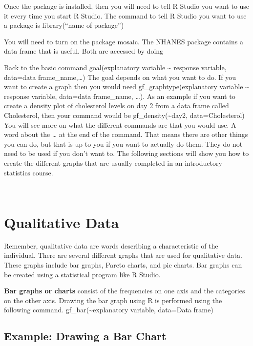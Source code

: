 \documentclass[]{book}
\begin{document}
Once the package is installed, then you will need to tell R Studio you want to use it every time you start R Studio. The command to tell R Studio you want to use a package is library(``name of package'')

You will need to turn on the package mosaic. The NHANES package contains a data frame that is useful. Both are accessed by doing

Back to the basic command
goal(explanatory variable \textasciitilde{} response variable, data=data frame\_name,\ldots{})
The goal depends on what you want to do. If you want to create a graph then you would need gf\_graphtype(explanatory variable \textasciitilde{} response variable, data=data frame\_name, \ldots{}). As an example if you want to create a density plot of cholesterol levels on day 2 from a data frame called Cholesterol, then your command would be
gf\_density(\textasciitilde{}day2, data=Cholesterol)
You will see more on what the different commands are that you would use. A word about the \ldots{} at the end of the command. That means there are other things you can do, but that is up to you if you want to actually do them. They do not need to be used if you don't want to. The following sections will show you how to create the different graphs that are usually completed in an introductory statistics course.

\emph{\\
}

\hypertarget{qualitative-data}{%
\section{Qualitative Data}\label{qualitative-data}}

Remember, qualitative data are words describing a characteristic of the individual. There are several different graphs that are used for qualitative data. These graphs include bar graphs, Pareto charts, and pie charts. Bar graphs can be created using a statistical program like R Studio.

\textbf{Bar graphs or charts} consist of the frequencies on one axis and the categories on the other axis. Drawing the bar graph using R is performed using the following command. gf\_bar(\textasciitilde{}explanatory variable, data=Data frame)

\hypertarget{example-drawing-a-bar-chart}{%
\subsection{Example: Drawing a Bar Chart}\label{example-drawing-a-bar-chart}}
\end{document}
